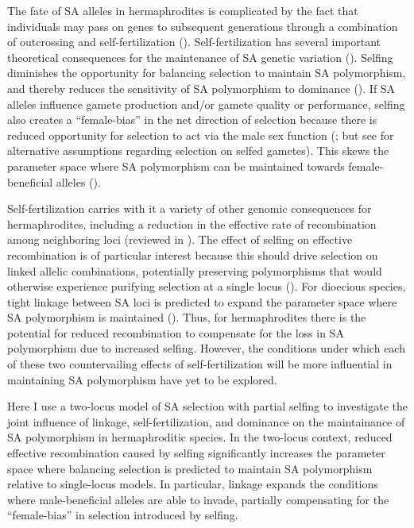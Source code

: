 \documentclass{article}
\begin{document}
The fate of SA alleles in hermaphrodites is complicated by the fact that individuals may pass on genes to subsequent generations through a combination of outcrossing and self-fertilization (\citealt{Goodwillie2005, JarneAuld2006, Igic2005, JordanConn2014}). Self-fertilization has several important theoretical consequences for the maintenance of SA genetic variation (\citealt{JordanConn2014, KimuraOhta1971}). Selfing diminishes the opportunity for balancing selection to maintain SA polymorphism, and thereby reduces the sensitivity of SA polymorphism to dominance (\citealt{JordanConn2014, Tazzyman2015}). If SA alleles influence gamete production and/or gamete quality or performance, selfing also creates a ``female-bias'' in the net direction of selection because there is reduced opportunity for selection to act via the male sex function (\citealt{Charlesworth1978, JordanConn2014}; but see \citealt{Tazzyman2015} for alternative assumptions regarding selection on selfed gametes). This skews the parameter space where SA polymorphism can be maintained towards female-beneficial alleles (\citealt{JordanConn2014}). 

Self-fertilization carries with it a variety of other genomic consequences for hermaphrodites, including a reduction in the effective rate of recombination among neighboring loci (reviewed in \citealt{Wright2008}). The effect of selfing on effective recombination is of particular interest because this should drive selection on linked allelic combinations, potentially preserving polymorphisms that would otherwise experience purifying selection at a single locus (\citealt{Fisher1930}). For dioecious species, tight linkage between SA loci is predicted to expand the parameter space where SA polymorphism is maintained (\citealt{Patten2010}). Thus, for hermaphrodites there is the potential for reduced recombination to compensate for the loss in SA polymorphism due to increased selfing. However, the conditions under which each of these two countervailing effects of self-fertilization will be more influential in maintaining SA polymorphism have yet to be explored. 

Here I use a two-locus model of SA selection with partial selfing to investigate the joint influence of linkage, self-fertilization, and dominance on the maintainance of SA polymorphism in hermaphroditic species. In the two-locus context, reduced effective recombination caused by selfing significantly increases the parameter space where balancing selection is predicted to maintain SA polymorphism relative to single-locus models. In particular, linkage expands the conditions where male-beneficial alleles are able to invade, partially compensating for the ``female-bias'' in selection introduced by selfing.
\end{document}
